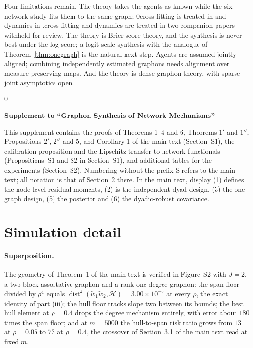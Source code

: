 \documentclass[12pt]{article}
\newcommand{\blind}{0}
\newcommand{\calH}{\mathcal{H}}
\newcommand{\dist}{\operatorname{dist}}
\begin{document}
Four limitations remain. The theory takes the agents as known while the six-network study fits them to the same graph; \blind cross-fitting is treated in \citet{PapamichalisRuane2026minimax} and dynamics in \citet{PapamichalisRuaneEtAl2026dynamic}.\else cross-fitting and dynamics are treated in two companion papers withheld for review.\fi{} The theory is Brier-score theory, and the synthesis is never best under the log score; a logit-scale synthesis with the analogue of Theorem~\ref{thm:onegraph} is the natural next step. Agents are assumed jointly aligned; combining independently estimated graphons needs alignment over measure-preserving maps. And the theory is dense-graphon theory, with sparse joint asymptotics open.


\setlength{\bibsep}{0pt plus 0.3ex}



\bigskip
{}\blind




\clearpage
\setcounter{section}{0}\setcounter{table}{0}\setcounter{figure}{0}\setcounter{equation}{0}
\renewcommand{\thesection}{S\arabic{section}}
\renewcommand{\thetable}{S\arabic{table}}
\renewcommand{\thefigure}{S\arabic{figure}}
\renewcommand{\theequation}{S\arabic{equation}}
\begin{center}
{\LARGE\bf Supplement to ``Graphon Synthesis of Network Mechanisms''}
\end{center}
\medskip
{}

This supplement contains the proofs of Theorems 1--4 and 6, Theorems $1'$ and $1''$, Propositions $2'$, $2''$ and 5, and Corollary 1 of the main text (Section~S1), the calibration proposition and the Lipschitz transfer to network functionals (Propositions~S1 and S2 in Section~S1), and additional tables for the experiments (Section~S2). Numbering without the prefix S refers to the main text; all notation is that of Section~2 there. In the main text, display (1) defines the node-level residual moments, (2) is the independent-dyad design, (3) the one-graph design, (5) the posterior and (6) the dyadic-robust covariance.

\section{Simulation detail}
\label{sec:Ssims}

\paragraph{Superposition.}
The geometry of Theorem~1 of the main text is verified in Figure~S2 with $J=2$, a two-block assortative graphon and a rank-one degree graphon: the span floor divided by $\rho^4$ equals $\dist^2(\tilde w_1\tilde w_2,\calH)=3.00\times10^{-3}$ at every $\rho$, the exact identity of part (iii); the hull floor tracks slope two between its bounds; the best hull element at $\rho=0.4$ drops the degree mechanism entirely, with error about $180$ times the span floor; and at $m=5000$ the hull-to-span risk ratio grows from $13$ at $\rho=0.05$ to $73$ at $\rho=0.4$, the crossover of Section~3.1 of the main text read at fixed $m$.
\end{document}
